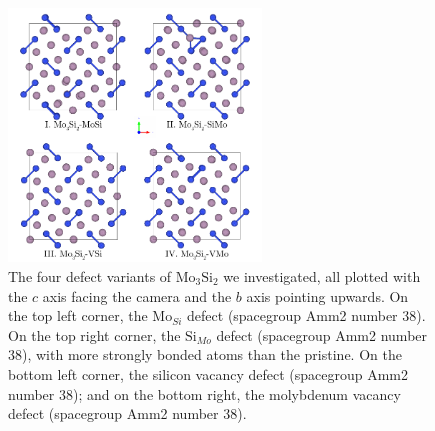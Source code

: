 \documentclass[12pt]{article}
\theoremstyle{plain}
\theoremstyle{definition}
\newcommand{\<}{\langle}
\renewcommand{\>}{\rangle}
\newcommand{\angstrom}{\textup{\AA}}
\begin{document}
\begin{figure}
\label{fig:mo3si2-defects-c}
\centering
\includegraphics[width=0.6\textwidth]{img/Mo3Si2-defects-c}
\caption{The four defect variants of $\text{Mo}_3\text{Si}_2$ we investigated, all plotted with the $c$ axis facing the camera and the $b$ axis pointing upwards. On the top left corner, the $\text{Mo}_{Si}$ defect (spacegroup Amm2 number 38). On the top right corner, the $\text{Si}_{Mo}$ defect (spacegroup Amm2 number 38), with more strongly bonded atoms than the pristine. On the bottom left corner, the silicon vacancy defect (spacegroup Amm2 number 38); and on the bottom right, the molybdenum vacancy defect (spacegroup Amm2 number 38).}
\end{figure}




\end{document}
